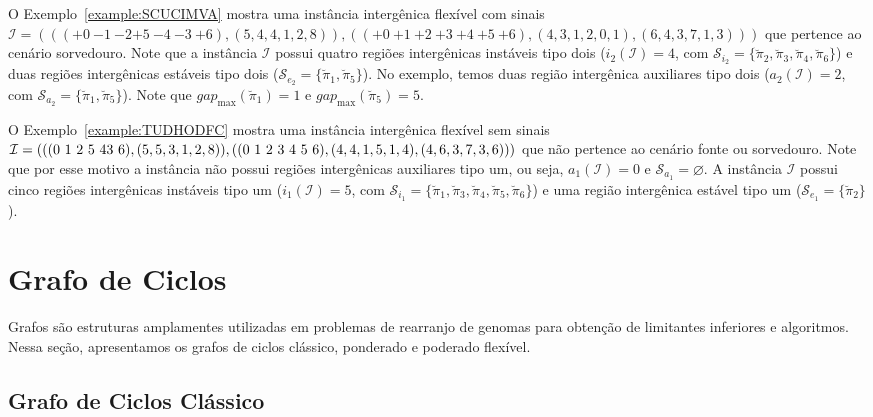 O Exemplo~\ref{example:SCUCIMVA} mostra uma instância intergênica flexível com sinais $\mathcal{I} = \allowbreak((({+0}~{-1}~{-2}\allowbreak{+5}~{-4}~{-3}\allowbreak~{+6}),\allowbreak(5,4,4,1,2,8)),\allowbreak(({+0}~{+1}~{+2}~{+3}~{+4}~{+5}~{+6}),\allowbreak(4,3,1,2,0,1),\allowbreak(6,4,3,7,1,3)))$ que pertence ao cenário sorvedouro. Note que a instância $\mathcal{I}$ possui quatro regiões intergênicas instáveis tipo dois ($i_2(\mathcal{I}) = 4$, com $\mathcal{S}_{i_{2}}=\{\breve\pi_2,\breve\pi_3,\breve\pi_4,\breve\pi_6\}$) e duas regiões intergênicas estáveis tipo dois ($\mathcal{S}_{e_{2}}=\{\breve\pi_1,\breve\pi_5\}$). No exemplo, temos duas região intergênica auxiliares tipo dois ($a_2(\mathcal{I}) = 2$, com $\mathcal{S}_{a_{2}}=\{\breve\pi_1,\breve\pi_5\}$). Note que $gap_{\max}(\breve\pi_1) = 1$ e $gap_{\max}(\breve\pi_5) = 5$.



O Exemplo~\ref{example:TUDHODFC} mostra uma instância intergênica flexível sem sinais $\mathcal{I} = (((0~1~2~5~4\break3~6),(5,5,3,1,2,8)),((0~1~2~3~4~5~6),(4,4,1,5,1,4),(4,6,3,7,3,6)))$ que não pertence ao cenário fonte ou sorvedouro. Note que por esse motivo a instância não possui regiões intergênicas auxiliares tipo um, ou seja, $a_1(\mathcal{I}) = 0$ e $\mathcal{S}_{a_{1}}=\varnothing$. A instância $\mathcal{I}$ possui cinco regiões intergênicas instáveis tipo um ($i_1(\mathcal{I}) = 5$, com $\mathcal{S}_{i_{1}}=\{\breve\pi_1,\breve\pi_3,\breve\pi_4,\breve\pi_5,\breve\pi_6\}$) e uma região intergênica estável tipo um ($\mathcal{S}_{e_{1}}=\{\breve\pi_2\}$).



\section{Grafo de Ciclos}

Grafos são estruturas amplamentes utilizadas em problemas de rearranjo de genomas para obtenção de limitantes inferiores e algoritmos. Nessa seção, apresentamos os grafos de ciclos clássico, ponderado e poderado flexível.

\subsection{Grafo de Ciclos Clássico}

